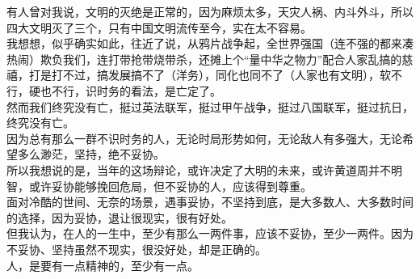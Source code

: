 \begin{multicols}{\theparacolNo}
有人曾对我说，文明的灭绝是正常的，因为麻烦太多，天灾人祸、内斗外斗，所以四大文明灭了三个，只有中国文明流传至今，实在太不容易。\\

我想想，似乎确实如此，往近了说，从鸦片战争起，全世界强国（连不强的都来凑热闹）欺负我们，连打带抢带烧带杀，还摊上个“量中华之物力”配合人家乱搞的慈禧，打是打不过，搞发展搞不了（洋务），同化也同不了（人家也有文明），软不行，硬也不行，识时务的看法，是亡定了。\\

然而我们终究没有亡，挺过英法联军，挺过甲午战争，挺过八国联军，挺过抗日，终究没有亡。\\

因为总有那么一群不识时务的人，无论时局形势如何，无论敌人有多强大，无论希望多么渺茫，坚持，绝不妥协。\\

所以我想说的是，当年的这场辩论，或许决定了大明的未来，或许黄道周并不明智，或许妥协能够挽回危局，但不妥协的人，应该得到尊重。\\

面对冷酷的世间、无奈的场景，遇事妥协，不坚持到底，是大多数人、大多数时间的选择，因为妥协，退让很现实，很有好处。\\

但我认为，在人的一生中，至少有那么一两件事，应该不妥协，至少一两件。因为不妥协、坚持虽然不现实，很没好处，却是正确的。\\

人，是要有一点精神的，至少有一点。\\
\ifnum{}
	\end{multicols}
\fi
\newpage

